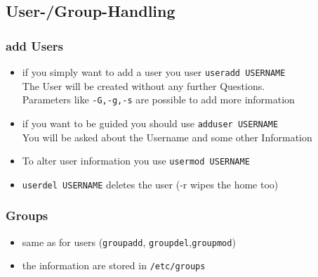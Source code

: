 \documentclass[handout]{beamer}
\newcommand{\code}[1]{\colorbox{lGray}{\texttt{#1}}}
\begin{document}
    \subsection{User-/Group-Handling}
	    \begin{frame}
			\frametitle{add Users}
			\begin{itemize}
                \item<1-> if you simply want to add a user you user \code{useradd USERNAME} \\
                          The User will be created without any further Questions. \\
                          Parameters like \code{-G,-g,-s} are possible to add more information
                \item<2-> if you want to be guided you should use \code{adduser USERNAME} \\
                         You will be asked about the Username and some other Information
                \item<3-> To alter user information you use \code{usermod USERNAME}
                \item<4-> \code{userdel USERNAME} deletes the user (-r wipes the home too)
            \end{itemize}
		\end{frame}
	    \begin{frame}
			\frametitle{Groups}
			\begin{itemize}
                \item<1-> same as for users (\code{groupadd}, \code{groupdel},\code{groupmod})
                \item<2-> the information are stored in \code{/etc/groups}
            \end{itemize}
		\end{frame}
\end{document}
